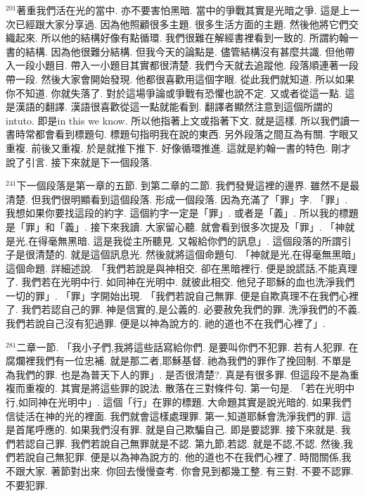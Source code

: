 \documentclass{book}
\begin{document}
$^{201}$著重我們活在光的當中.
亦不要害怕黑暗.
當中的爭戰其實是光暗之爭.
這是上一次已經跟大家分享過.
因為他照顧很多主題.
很多生活方面的主題.
然後他將它們交織起來.
所以他的結構好像有點循環.
我們很難在解經書裡看到一致的.
所謂約翰一書的結構.
因為他很難分結構.
但我今天的論點是.
儘管結構沒有甚麼共識.
但他帶入一段小題目.
帶入一小題目其實都很清楚.
我們今天就去追蹤他.
段落順連著一段帶一段.
然後大家會開始發現.
他都很喜歡用這個字眼.
從此我們就知道.
所以如果你不知道.
你就失落了.
對於這場爭論或爭戰有恐懼也說不定.
又或者從這一點.
這是漢語的翻譯.
漢語很喜歡從這一點就能看到.
翻譯者顯然注意到這個所謂的intuto.
即是in this we know.
所以他指著上文或指著下文.
就是這樣.
所以我們讀一書時常都會看到標題句.
標題句指明我在說的東西.
另外段落之間互為有關.
字眼又重複.
前後又重複.
於是就推下推下.
好像循環推進.
這就是約翰一書的特色.
剛才說了引言.
接下來就是下一個段落.

$^{241}$下一個段落是第一章的五節.
到第二章的二節.
我們發覺這裡的邊界.
雖然不是最清楚.
但我們很明顯看到這個段落.
形成一個段落.
因為充滿了「罪」字.
「罪」.
我想如果你要找這段的約字.
這個約字一定是「罪」.
或者是「義」.
所以我的標題是「罪」和「義」.
接下來我讀.
大家留心聽.
就會看到很多次提及「罪」.
「神就是光,在得毫無黑暗.
這是我從主所聽見.
又報給你們的訊息」.
這個段落的所謂引子是很清楚的.
就是這個訊息光.
然後就將這個命題句.
「神就是光,在得毫無黑暗」這個命題.
詳細述說.
「我們若說是與神相交.
卻在黑暗裡行.
便是說謊話,不能真理了.
我們若在光明中行.
如同神在光明中.
就彼此相交.
他兒子耶穌的血也洗淨我們一切的罪」.
「罪」字開始出現.
「我們若說自己無罪.
便是自欺真理不在我們心裡了.
我們若認自己的罪.
神是信實的,是公義的.
必要赦免我們的罪.
洗淨我們的不義.
我們若說自己沒有犯過罪.
便是以神為說方的.
祂的道也不在我們心裡了」.

$^{281}$二章一節.
「我小子們,我將這些話寫給你們.
是要叫你們不犯罪.
若有人犯罪.
在腐爛裡我們有一位忠補.
就是那二者,耶穌基督.
祂為我們的罪作了挽回制.
不單是為我們的罪.
也是為普天下人的罪」.
是否很清楚?.
真是有很多罪.
但這段不是為重複而重複的.
其實是將這些罪的說法.
散落在三對條件句.
第一句是.
「若在光明中行,如同神在光明中」.
這個「行」在罪的標題.
大命題其實是說光暗的.
如果我們信徒活在神的光的裡面.
我們就會這樣處理罪.
第一,知道耶穌會洗淨我們的罪.
這是首尾呼應的.
如果我們沒有罪.
就是自己欺騙自己.
即是要認罪.
接下來就是.
我們若認自己罪.
我們若說自己無罪就是不認.
第九節,若認.
就是不認,不認.
然後,我們若說自己無犯罪.
便是以為神為說方的.
他的道也不在我們心裡了.
時間關係,我不跟大家.
著節對出來.
你回去慢慢查考.
你會見到都幾工整.
有三對.
不要不認罪.
不要犯罪.
\end{document}
